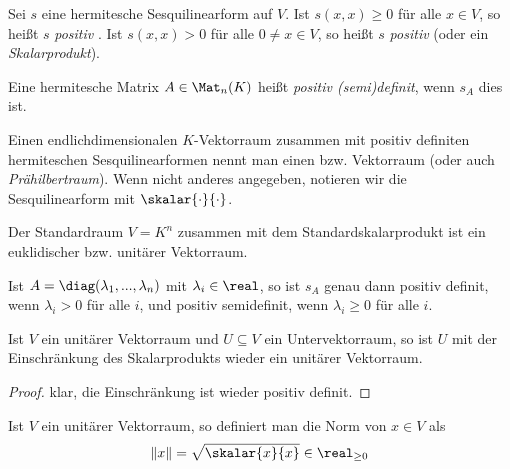 \begin{definition}
	Sei $s$ eine hermitesche Sesquilinearform auf $V$. Ist $s(x,x)\ge 0$ für alle $x\in V$, so heißt $s$ \emph{positiv} . Ist $s(x,x)>0$ für alle $0\neq x\in V$, so heißt $s$ \emph{positiv}  (oder ein \emph{Skalarprodukt}).
	
	Eine hermitesche Matrix $A\in\Mat_n(K)$ heißt \emph{positiv (semi)definit}, wenn $s_A$ dies ist.
	
	Einen endlichdimensionalen $K$-Vektorraum zusammen mit positiv definiten hermiteschen Sesquilinearformen nennt man einen  bzw.  Vektorraum (oder auch \emph{Prähilbertraum}). Wenn nicht anderes angegeben, notieren wir die Sesquilinearform mit $\skalar{\cdot}{\cdot}$.
\end{definition}

\begin{example}
	Der Standardraum $V=K^n$ zusammen mit dem Standardskalarprodukt ist ein euklidischer bzw. unitärer Vektorraum.
\end{example}

\begin{example}
	Ist $A=\diag(\lambda_1,...,\lambda_n)$ mit $\lambda_i\in\real$, so ist $s_A$ genau dann positiv definit, wenn $\lambda_i>0$ für alle $i$, und positiv semidefinit, wenn $\lambda_i\ge 0$ für alle $i$.
\end{example}

\begin{proposition}
	Ist $V$ ein unitärer Vektorraum und $U\subseteq V$ ein Untervektorraum, so ist $U$ mit der Einschränkung des Skalarprodukts wieder ein unitärer Vektorraum.
\end{proposition}
\begin{proof}
	klar, die Einschränkung ist wieder positiv definit.
\end{proof}

\begin{definition}
	Ist $V$ ein unitärer Vektorraum, so definiert man die Norm von $x\in V$ als
	\begin{align}
		\Vert x\Vert = \sqrt{\skalar{x}{x}}\in\real_{\ge 0}\notag
	\end{align}
\end{definition}

